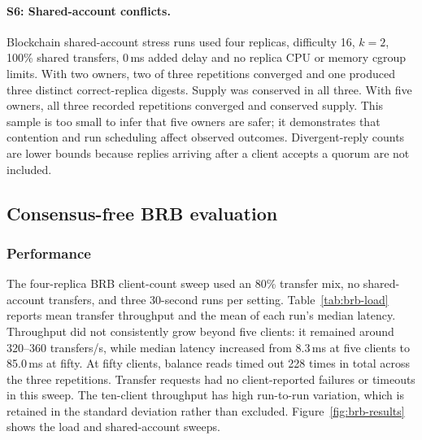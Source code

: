 \documentclass[sigconf,a4paper]{acmart}
\begin{document}
    \paragraph{S6: Shared-account conflicts.}
    Blockchain shared-account stress runs used four replicas, difficulty 16,
    $k=2$, 100\% shared transfers, 0\,ms added delay and no replica CPU or
    memory cgroup limits. With two owners, two of three repetitions converged and one
    produced three distinct correct-replica digests. Supply was conserved in
    all three. With five owners, all three recorded repetitions converged and
    conserved supply. This sample is too small to infer that five owners are
    safer; it demonstrates that contention and run scheduling affect observed
    outcomes. Divergent-reply counts are lower bounds because replies arriving
    after a client accepts a quorum are not included.


    \subsection{Consensus-free BRB evaluation}
    \label{subsec:eval-brb}
    \subsubsection{Performance}

    The four-replica BRB client-count sweep used an
    80\% transfer mix, no shared-account transfers, and three 30-second runs per
    setting. Table~\ref{tab:brb-load} reports mean transfer throughput and the
    mean of each run's median latency. Throughput did not consistently grow
    beyond five clients: it remained around 320--360 transfers/s, while median
    latency increased from 8.3\,ms at five clients to 85.0\,ms at fifty. At
    fifty clients, balance reads timed out 228 times in total across the three
    repetitions. Transfer requests had no client-reported failures or timeouts
    in this sweep. The ten-client throughput has high run-to-run variation,
    which is retained in the standard deviation rather than excluded.
    Figure~\ref{fig:brb-results} shows the load and shared-account sweeps.
\end{document}
